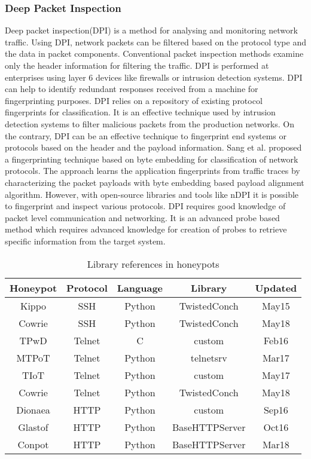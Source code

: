 \documentclass[../main.tex]{subfiles}
\begin{document}
\subsubsection{Deep Packet Inspection}
Deep packet inspection(DPI) is a method for analysing and monitoring network traffic. Using DPI, network packets can be filtered based on the protocol type and the data in packet components. Conventional packet inspection methods examine only the header information for filtering the traffic. DPI is performed at enterprises using layer 6 devices like firewalls or intrusion detection systems. DPI can help to identify redundant responses received from a machine for fingerprinting purposes. DPI relies on a repository of existing protocol fingerprints for classification. It is an effective technique used by intrusion detection systems to filter malicious packets from the production networks. On the contrary, DPI can be an effective technique to fingerprint end systems or protocols based on the header and the payload information. Sang et al.\cite{Sang} proposed a fingerprinting technique based on byte embedding for classification of network protocols. The approach learns the application fingerprints from traffic traces by characterizing the packet payloads with byte embedding based payload alignment algorithm. However, with open-source libraries and tools like nDPI\cite{nDPI} it is possible to fingerprint and inspect various protocols. DPI requires good knowledge of packet level communication and networking. It is an advanced probe based method which requires advanced knowledge for creation of probes to retrieve specific information from the target system. 
\newline

\begin{table}
\begin{tabular}{||c c c c c||} 
 \hline
 Honeypot & Protocol & Language & Library & Updated \\ [0.5ex] 
 \hline
 Kippo  & SSH    & Python &  TwistedConch & May15 \\ 
 Cowrie & SSH    & Python &  TwistedConch & May18 \\
 TPwD   & Telnet & C      &  custom       & Feb16 \\
 MTPoT  & Telnet & Python &  telnetsrv    & Mar17 \\
 TIoT   & Telnet & Python &  custom       & May17 \\
 Cowrie & Telnet & Python &  TwistedConch & May18 \\
 Dionaea& HTTP   & Python &  custom       & Sep16 \\
 Glastof& HTTP   & Python &  BaseHTTPServer& Oct16 \\
 Conpot & HTTP   & Python &  BaseHTTPServer& Mar18 \\ [1ex] 
 \hline
\end{tabular}
\caption{Library references in honeypots}
\label{library}
\end{table}
\end{document}
